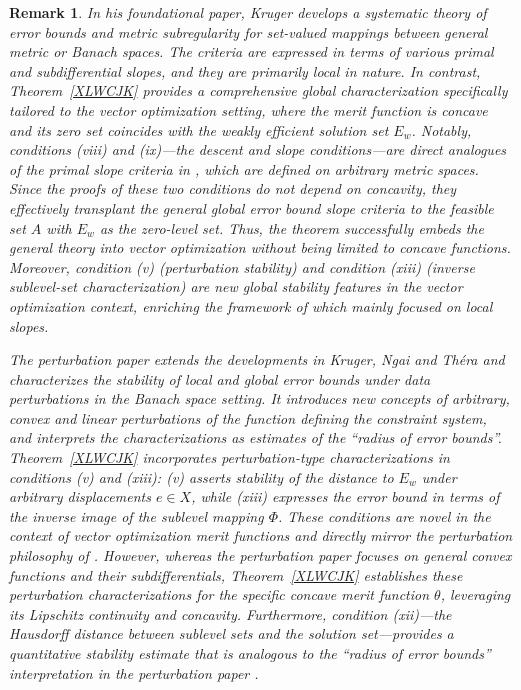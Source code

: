 \documentclass[11pt]{article}
\newtheorem{remark}{Remark}[section]
\begin{document}
\begin{remark}
 		
 		
 		
 In his foundational paper, Kruger   \cite{Kruger}   develops a systematic theory of error bounds and metric subregularity for set-valued mappings between general metric or Banach spaces. The criteria are expressed in terms of various primal and subdifferential slopes, and they are primarily \emph{local} in nature. In contrast, Theorem~\ref{XLWCJK} provides a comprehensive \emph{global} characterization specifically tailored to the vector optimization setting, where the merit function is concave and its zero set coincides with the weakly efficient solution set \(E_w\). 
 	Notably, conditions (viii) and (ix)---the descent and slope conditions---are direct analogues of the primal slope criteria in    \cite{Kruger}, which are defined on arbitrary metric spaces. Since the proofs of these two conditions do not depend on concavity, they effectively transplant the general global error bound slope criteria to the feasible set \(A\) with \(E_w\) as the zero-level set. Thus, the theorem successfully embeds the general theory into vector optimization without being limited to concave functions. Moreover, condition (v) (perturbation stability) and condition (xiii) (inverse sublevel-set characterization) are new global stability features in the vector optimization context, enriching the framework of    \cite{Kruger} which mainly focused on local slopes.
 		
 		The perturbation paper \cite{KLT2018} extends the developments in Kruger, Ngai and Th\'era      \cite{KNT2010} and characterizes the stability of local and global error bounds under data perturbations in the Banach space setting. It introduces new concepts of arbitrary, convex and linear perturbations of the function defining the constraint system, and interprets the characterizations as estimates of the ``radius of error bounds''. 	Theorem~\ref{XLWCJK} incorporates perturbation-type characterizations in conditions (v) and (xiii): (v) asserts stability of the distance to \(E_w\) under arbitrary displacements \(e\in X\), while (xiii) expresses the error bound in terms of the inverse image of the sublevel mapping \(\Phi\). These conditions are novel in the context of vector optimization merit functions and directly mirror the perturbation philosophy of  \cite{KLT2018}. However, whereas the perturbation paper focuses on general convex functions and their subdifferentials, Theorem~\ref{XLWCJK} establishes these perturbation characterizations for the specific concave merit function \(\theta\), leveraging its Lipschitz continuity and concavity. Furthermore, condition (xii)---the Hausdorff distance between sublevel sets and the solution set---provides a quantitative stability estimate that is analogous to the ``radius of error bounds'' interpretation in the perturbation paper \cite{KLT2018}.
 		

\end{remark}
\end{document}
